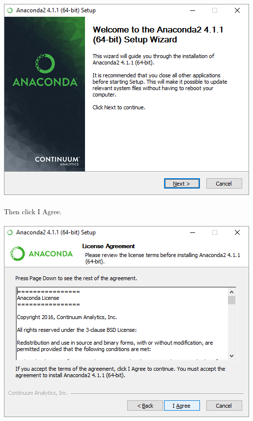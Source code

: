 \documentclass[]{article}
\begin{document}
\paragraph{}
\begin{centering}
    \centerline{\includegraphics[scale=0.7]{Screenshot_5.png}}
\end{centering}

\paragraph{}
Then click I Agree.
\paragraph{}
\begin{centering}
    \centerline{\includegraphics[scale=0.7]{Screenshot_6.png}}
\end{centering}
\end{document}
